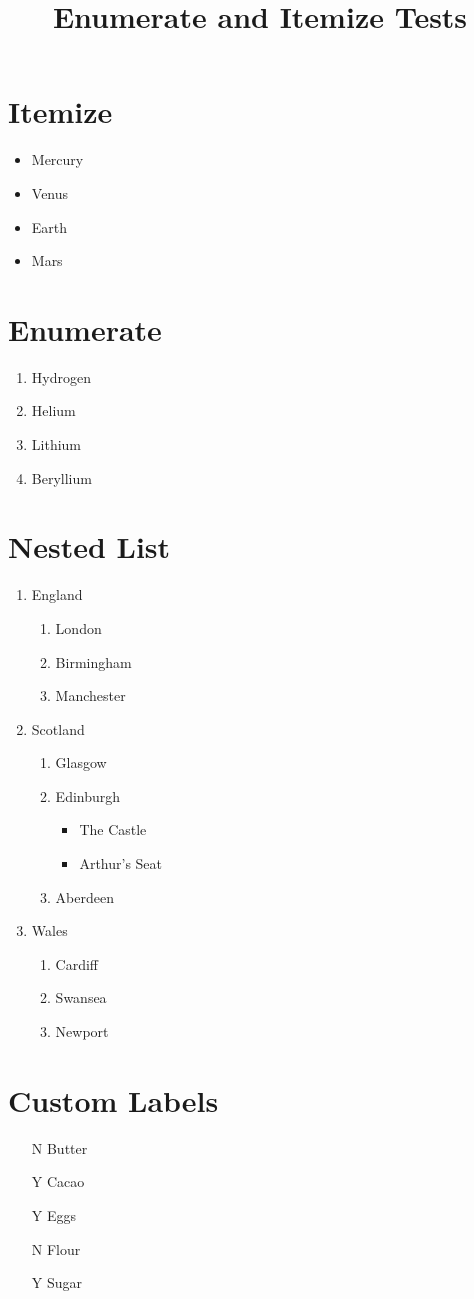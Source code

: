 \documentclass{article}
\title{Enumerate and Itemize Tests}
\begin{document}
\section{Itemize}

\begin{itemize}
\item
Mercury
\item
Venus
\item
Earth
\item
Mars
\end{itemize}

\section{Enumerate}

\begin{enumerate}
\item
Hydrogen
\item
Helium
\item
Lithium
\item
Beryllium
\end{enumerate}

\section{Nested List}

\begin{enumerate}
\item
England
\begin{enumerate}
\item
London
\item
Birmingham
\item
Manchester
\end{enumerate}
\item
Scotland
\begin{enumerate}
\item
Glasgow
\item
Edinburgh
\begin{itemize}
\item
The Castle
\item
Arthur's Seat
\end{itemize}
\item
Aberdeen
\end{enumerate}
\item
Wales
\begin{enumerate}
\item
Cardiff
\item
Swansea
\item
Newport
\end{enumerate}
\end{enumerate}

\section{Custom Labels}

\begin{itemize}
\item[N]
Butter
\item[Y]
Cacao
\item[Y]
Eggs
\item[N]
Flour
\item[Y]
Sugar
\end{itemize}
\end{document}
